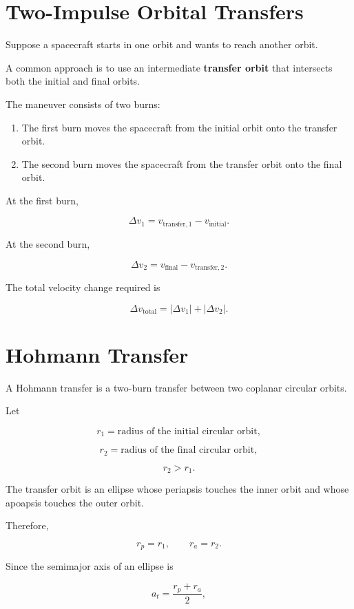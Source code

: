 \documentclass{article}
\begin{document}
\section{Two-Impulse Orbital Transfers}

Suppose a spacecraft starts in one orbit and wants to reach another orbit.

A common approach is to use an intermediate \textbf{transfer orbit} that intersects both the initial and final orbits.

The maneuver consists of two burns:

\begin{enumerate}
    \item The first burn moves the spacecraft from the initial orbit onto the transfer orbit.
    \item The second burn moves the spacecraft from the transfer orbit onto the final orbit.
\end{enumerate}

At the first burn,

\[
\boxed{
\Delta v_1
=
v_{\text{transfer},1}
-
v_{\text{initial}}
}.
\]

At the second burn,

\[
\boxed{
\Delta v_2
=
v_{\text{final}}
-
v_{\text{transfer},2}
}.
\]

The total velocity change required is

\[
\boxed{
\Delta v_{\text{total}}
=
|\Delta v_1|
+
|\Delta v_2|
}.
\]


\section{Hohmann Transfer}

A Hohmann transfer is a two-burn transfer between two coplanar circular orbits.

Let

\[
r_1 = \text{radius of the initial circular orbit},
\]

\[
r_2 = \text{radius of the final circular orbit},
\]

\[
r_2>r_1.
\]

The transfer orbit is an ellipse whose periapsis touches the inner orbit and whose apoapsis touches the outer orbit.

Therefore,

\[
r_p=r_1,
\qquad
r_a=r_2.
\]

Since the semimajor axis of an ellipse is

\[
a_t
=
\frac{r_p+r_a}{2},
\]
\end{document}
